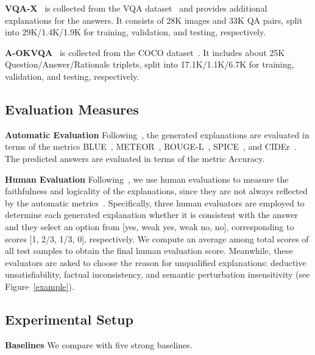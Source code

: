 \documentclass[letterpaper]{article} %
\begin{document}
\noindent
\textbf{VQA-X}~\cite{park2018multimodal} is collected from the VQA dataset~\cite{antol2015vqa} and provides additional explanations for the answers. It consists of 28K images and 33K QA pairs, split into 29K/1.4K/1.9K for training, validation, and testing, respectively.

\noindent
\textbf{A-OKVQA}~\cite{schwenk2022okvqa} is collected from the COCO dataset~\cite{lin2014microsoft}. It includes about 25K Question/Answer/Rationale triplets, split into 17.1K/1.1K/6.7K for training, validation, and testing, respectively.


\subsection{Evaluation Measures}
\textbf{Automatic Evaluation} Following~\cite{suo2023s3c}, the generated explanations are evaluated in terms of the metrics BLUE~\cite{papineni2002bleu}, METEOR~\cite{denkowski2014meteor}, ROUGE-L~\cite{lin2004rouge}, SPICE~\cite{anderson2016spice}, and CIDEr~\cite{vedantam2015cider}. The predicted answers are evaluated in terms of the metric Accuracy.

\noindent
\textbf{Human Evaluation} Following~\cite{suo2023s3c}, we use human evaluations to measure the faithfulness and logicality of the explanations, since they are not always reflected by the automatic metrics~\cite{kayser2021vil}. Specifically, three human evaluators are employed to determine each generated explanation whether it is consistent with the answer and they select an option from [yes, weak yes, weak no, no], corresponding to scores [1, 2/3, 1/3, 0], respectively. We compute an average among total scores of all test samples to obtain the final human evaluation score. Meanwhile, these evaluators are asked to choose the reason for unqualified explanations: deductive unsatisfiability, factual inconsistency, and semantic perturbation insensitivity (see Figure~\ref{example}).


\subsection{Experimental Setup}

\noindent
\textbf{Baselines} We compare with five strong baselines.
\end{document}
